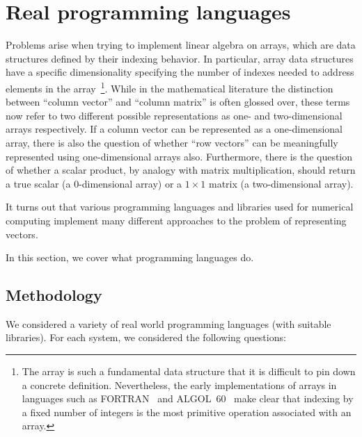\section{Real programming languages}

Problems arise when trying to implement linear algebra on arrays, which are
data structures defined by their indexing behavior. In particular, array data
structures have a specific dimensionality specifying the number of indexes
needed to address elements in the array~\footnote{The array is such a
fundamental data structure that it is difficult to pin down a concrete
definition. Nevertheless, the early implementations of arrays in languages such
as FORTRAN~\cite[p36]{Backus1956} and ALGOL~60~\cite[Sec. 2.3]{Randell1964}
make clear that indexing by a fixed number of integers is the most primitive
operation associated with an array.}. While in the mathematical literature the
distinction between ``column vector'' and ``column matrix'' is often glossed
over, these terms now refer to two different possible representations as one-
and two-dimensional arrays respectively. If a column vector can be represented
as a one-dimensional array, there is also the question of whether ``row
vectors'' can be meaningfully represented using one-dimensional arrays also.
Furthermore, there is the question of whether a scalar product, by analogy with
matrix multiplication, should return a true scalar (a 0-dimensional array) or a
$1\times1$ matrix (a two-dimensional array).

It turns out that various programming languages and libraries used for
numerical computing implement many different approaches to the problem of
representing vectors.

In this section, we cover what programming languages do.

\subsection{Methodology}

We considered a variety of real world programming languages (with suitable
libraries).  For each system, we considered the following questions:

